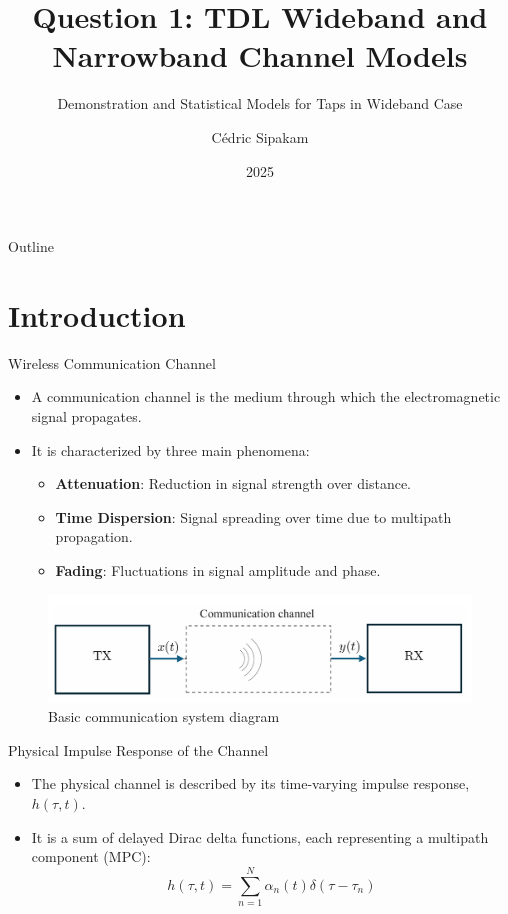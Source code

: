 \documentclass{beamer}
\title[TDL Wideband and Narrowband Channel Models]{Question 1: TDL Wideband and Narrowband Channel Models}
\subtitle{Demonstration and Statistical Models for Taps in Wideband Case}
\author{Cédric Sipakam}
\institute{ULB | VUB \\
	\vspace{1.5em}
	ELEC-H415: Communication Channels}
\date{2025}
\begin{document}
	\begin{frame}
		\titlepage
	\end{frame}
	
	\begin{frame}{Outline}
		\tableofcontents
	\end{frame}
	
	\section{Introduction}
	
	\begin{frame}{Wireless Communication Channel}
		\begin{itemize}
			\item A communication channel is the medium through which the electromagnetic signal propagates.
			\item It is characterized by three main phenomena:
			\begin{itemize}
				\item \textbf{Attenuation}: Reduction in signal strength over distance.
				\item \textbf{Time Dispersion}: Signal spreading over time due to multipath propagation.
				\item \textbf{Fading}: Fluctuations in signal amplitude and phase.
			\end{itemize}
		\end{itemize}
		\begin{figure}
			\centering
			\includegraphics[width=0.8\linewidth]{"pictures/wireless-comm-channel.png"}
			\caption{Basic communication system diagram}
		\end{figure}
	\end{frame}
	
	
	\begin{frame}{Physical Impulse Response of the Channel}
		\begin{itemize}
			\item The physical channel is described by its time-varying impulse response, $h(\tau, t)$.
			\item It is a sum of delayed Dirac delta functions, each representing a multipath component (MPC):
			\[
			h(\tau,t) = \sum_{n=1}^{N} \alpha_n(t) \delta(\tau - \tau_n)
			\]
		\end{itemize}
	\end{frame}
	
\end{document}
